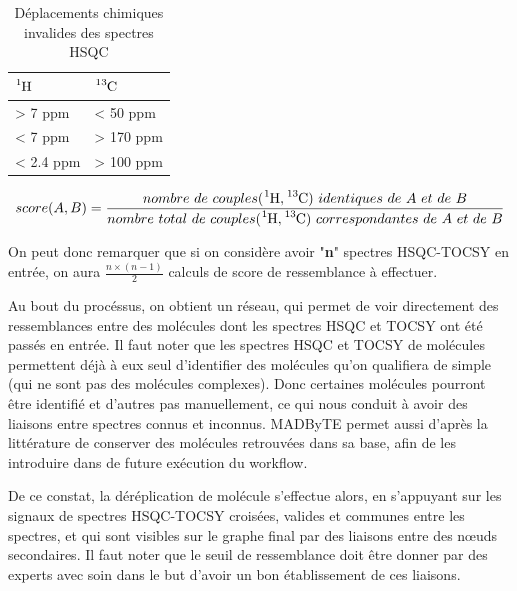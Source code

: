 \documentclass[12pt, french, latin.medieval, a4paper]{report}
\begin{document}
        \begin{table}
            \centering
            \begin{tabular}{|C{2cm}|C{1cm}|}
                \hline $\ce{^{1}_{}H}$  & $\ce{^{13}_{}C}$ \\
                \hline  > 7 ppm & < 50 ppm\\
                \hline  < 7 ppm & > 170 ppm\\
                \hline  < 2.4 ppm & > 100 ppm\\
                \hline 
            \end{tabular}
            \caption{Déplacements chimiques invalides des spectres HSQC \cite{egan2021development}}
            \label{tab:hsqcinvalides}
        \end{table}

        \begin{equation}
            score(A,B) = \frac{nombre\ de\ couples (\ce{^{1}_{}H},\ce{^{13}_{}C}) \ identiques\ de\ A\ et\ de\ B}{nombre\ total\ de\ couples (\ce{^{1}_{}H},\ce{^{13}_{}C}) \ correspondantes\ de\ A\ et\ de\ B}
            \label{form:scorelikeness}
        \end{equation}

        On peut donc remarquer que si on considère avoir "\textbf{n}" spectres HSQC-TOCSY en entrée, on aura $\frac{n \times (n-1)}{2}$  calculs de score de ressemblance à effectuer.
        
        Au bout du procéssus, on obtient un réseau, qui permet de voir directement des ressemblances entre des molécules dont les spectres HSQC et TOCSY ont été passés en entrée. Il faut noter que les spectres HSQC et TOCSY de molécules permettent déjà à eux seul d’identifier des molécules qu’on qualifiera de simple (qui ne sont pas des molécules complexes). Donc certaines molécules pourront être identifié et d’autres pas manuellement, ce qui nous conduit à avoir des liaisons entre spectres connus et inconnus. MADByTE permet aussi d’après la littérature de conserver des molécules retrouvées dans sa base, afin de les introduire dans de future exécution du workflow.

        De ce constat, la déréplication de molécule s’effectue alors, en s’appuyant sur les signaux de spectres HSQC-TOCSY croisées, valides et communes entre les spectres, et qui sont visibles sur le graphe final par des liaisons entre des nœuds secondaires. Il faut noter que le seuil de ressemblance doit être donner par des experts avec soin dans le but d’avoir un bon établissement de ces liaisons.
\end{document}

